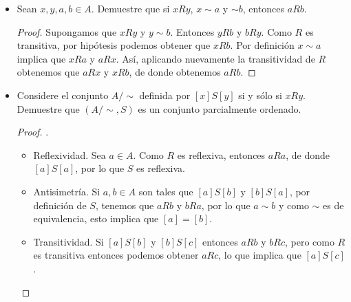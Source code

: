 \documentclass[letterpaper,11pt]{article}
\begin{document}
\begin{enumerate}
\begin{itemize}
\begin{proof}
\begin{itemize}
                \item Simetría. Si $a \sim b$ entonces $aRb$ y $bRa$, por lo que 
                $bRa$ y $aRb$, lo que implica que $b \sim a$.

                \item Transitividad. Si $a \sim b$ y $b \sim c$ entonces 
                $aRb$, $bRa$, $bRc$ y $cRb$. Como $R$ es transitiva, entonces 
                podemos obtener $aRc$ y $cRa$, lo cual implica que $a \sim c$. 
            \end{itemize}
        \end{proof}

        \item Sean $x, y, a, b \in A$. Demuestre que si $xRy$, $x \sim a$ y 
        $\sim b$, entonces $aRb$.

        \begin{proof}
            Supongamos que $xRy$ y $y \sim b$. Entonces $yRb$ y $bRy$. Como 
            $R$ es transitiva, por hipótesis podemos obtener que $xRb$. Por 
            definición $x \sim a$ implica que $xRa$ y $aRx$. Así, aplicando 
            nuevamente la transitividad de $R$ obtenemos que $aRx$ y $xRb$, 
            de donde obtenemos $aRb$.

        \end{proof}

        \item Considere el conjunto $A/\sim$ definida por $[x]S[y]$ si y sólo 
        si $xRy$. Demuestre que $(A/\sim, S)$ es un conjunto parcialmente
        ordenado.

        \begin{proof} .
            \begin{itemize}
                \item Reflexividad. Sea $a \in A$. Como $R$ es reflexiva,
                entonces $aRa$, de donde $[a]S[a]$, por lo que $S$ es reflexiva.

                \item Antisimetría. Si $a, b ∈ A$ son tales que $[a]S[b]$ y 
                $[b]S[a]$, por definición de $S$, tenemos que $aRb$ y $bRa$, 
                por lo que $a \sim b$ y como $\sim$ es de equivalencia, esto 
                implica que $[a] = [b]$. 

                \item Transitividad. Si $[a]S[b]$ y $[b]S[c]$ entonces $aRb$ y 
                $bRc$, pero como $R$ es transitiva entonces podemos obtener 
                $aRc$, lo que implica que $[a]S[c]$.
            \end{itemize}
        \end{proof}
    \end{itemize}


\end{enumerate}
\end{document}
